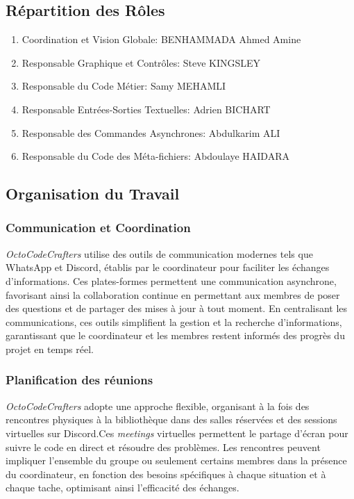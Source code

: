 \documentclass{article}
\begin{document}
\subsection{Répartition des Rôles}
\begin{enumerate}
    \item Coordination et Vision Globale: BENHAMMADA Ahmed Amine
    \item Responsable Graphique et Contrôles: Steve KINGSLEY
    \item Responsable du Code Métier: Samy MEHAMLI
    \item Responsable Entrées-Sorties Textuelles: Adrien BICHART
    \item Responsable des Commandes Asynchrones: Abdulkarim ALI
    \item Responsable du Code des Méta-fichiers: Abdoulaye HAIDARA
\end{enumerate}
\subsection{Organisation du Travail}
\subsubsection{Communication et Coordination}
\textit{OctoCodeCrafters} utilise des outils de communication modernes tels que WhatsApp et Discord, établis par le coordinateur pour faciliter les échanges d'informations. Ces plates-formes permettent une communication asynchrone, favorisant ainsi la collaboration continue en permettant aux membres de poser des questions et de partager des mises à jour à tout moment. En centralisant les communications, ces outils simplifient la gestion et la recherche d'informations, garantissant que le coordinateur et les membres restent informés des progrès du projet en temps réel.
\subsubsection{Planification des réunions}
\textit{OctoCodeCrafters} adopte une approche flexible, organisant à la fois des rencontres physiques à la bibliothèque dans des salles réservées et des sessions virtuelles sur Discord.Ces \textit{meetings}    virtuelles permettent le partage d'écran pour suivre le code en direct et résoudre des problèmes. Les rencontres peuvent impliquer l'ensemble du groupe ou seulement certains membres dans la présence du coordinateur, en fonction des besoins spécifiques à chaque situation et à chaque tache, optimisant ainsi l'efficacité des échanges.
\end{document}
